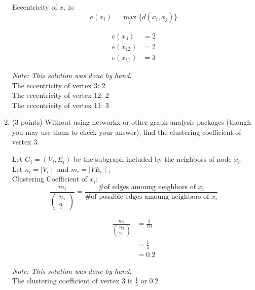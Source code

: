 \documentclass[11pt]{article}
\begin{document}
\begin{enumerate}
\begin{tcolorbox}[width=\linewidth,colback=yellow!5,colframe=yellow!75!black!75,title=Notes]
        Eccentricity of $x_i$ is: $$e(x_i) = \max_{i} \lbrace d( x_{i} , x_{j} ) \rbrace$$
    \end{tcolorbox}
    \begin{align*}
        e(x_3) &= 2 \\
        e(x_{12}) &= 2 \\
        e(x_{11}) &= 3
    \end{align*}
    \begin{tcolorbox}[width=\linewidth,title=Problem 2 Answer - Eccentricity]
        \textit{Note: This solution was done by hand.}\vspace{5pt} \\
        The eccentricity of vertex 3: $2$ \\
        The eccentricity of vertex 12: $2$ \\
        The eccentricity of vertex 11: $3$
    \end{tcolorbox}

    \item (3 points) Without using networkx or other graph analysis packages
    (though you may use them to check your answer), find the clustering
    coefficient of vertex 3.
    \begin{tcolorbox}[width=\linewidth,colback=yellow!5,colframe=yellow!75!black!75,title=Notes]
        Let $G_i = (V_i, E_i)$ be the subgraph included by the neighbors of node $x_i$. \\
        Let $n_i = \mid V_i \mid$ and $m_i = \mid VE_i \mid$, \\
        Clustering Coefficient of $x_i$:
        $$\frac{ m_{i} }{ ( \substack{ n_{i} \\ 2} ) } = \frac{ \text{\# of edges amoung neighbors of } x_{i} }{ \text{\# of possible edges amoung neighbors of } x_{i} }$$
    \end{tcolorbox}
    \begin{align*}
        \frac{ m_{3} }{ ( \substack{ n_{3} \\ 2} ) } &= \frac{2}{10} \\
        &= \frac{1}{5} \\
        &= 0.2
    \end{align*}
    \begin{tcolorbox}[width=\linewidth,title=Problem 3 Answer - Clustering Coefficient]
        \textit{Note: This solution was done by hand.}\vspace{5pt} \\
        The clustering coefficient of vertex 3 is $\frac{1}{5}$ or $0.2$
    \end{tcolorbox}


\end{enumerate}
\end{document}
